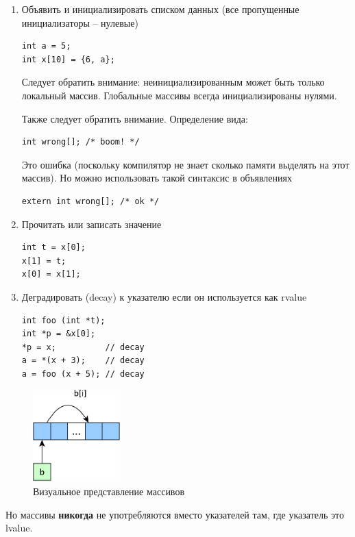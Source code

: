 \documentclass[a4paper,12pt,oneside]{book}
\begin{document}
\begin{enumerate}
\item Объявить и инициализировать списком данных (все пропущенные инициализаторы -- нулевые)
\begin{lstlisting}
int a = 5;
int x[10] = {6, a};
\end{lstlisting}

Следует обратить внимание: неинициализированным может быть только локальный массив. Глобальные массивы всегда инициализированы нулями.

Также следует обратить внимание. Определение вида:
\begin{lstlisting}
int wrong[]; /* boom! */
\end{lstlisting}
Это ошибка (поскольку компилятор не знает сколько памяти выделять на этот массив). Но можно использовать такой синтаксис в объявлениях
\begin{lstlisting}
extern int wrong[]; /* ok */
\end{lstlisting}
\item Прочитать или записать значение
\begin{lstlisting}
int t = x[0];
x[1] = t;
x[0] = x[1];
\end{lstlisting}
\item Деградировать (decay) к указателю если он используется как rvalue\label{ArrDecaying}
\begin{lstlisting}
int foo (int *t);
int *p = &x[0];
*p = x;          // decay
a = *(x + 3);    // decay 
a = foo (x + 5); // decay 
\end{lstlisting}
\end{enumerate}

\begin{figure}[h!]
\centering
\includegraphics[width=0.3\textwidth]{illustrations/arrays-crop.pdf}
\caption{Визуальное представление массивов}
\label{fig:arrays-crop}
\end{figure}

Но массивы \textbf{никогда} не употребляются вместо указателей там, где указатель это lvalue.
\end{document}
